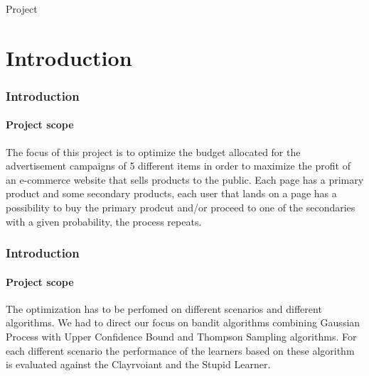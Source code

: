 \documentclass[11pt]{beamer}
\begin{document}
\frame{\titlepage}

\begin{frame}{Project}
    \tableofcontents[hideallsubsections]
\end{frame}


\AtBeginSection[]
{
\begin{frame}{}
    \tableofcontents[sections={\thesection}]
\end{frame}
}


\section{Introduction}


\begin{frame}

\frametitle{Introduction}
\framesubtitle{Project scope}

The focus of this project is to optimize the budget allocated for the advertisement campaigns of 5 different items in order to maximize the profit of an e-commerce website that sells products to the public.
Each page has a primary product and some secondary products, each user that lands on a page has a possibility to buy the primary prodcut and/or proceed to one of the secondaries with a given probability, the process repeats.

\end{frame}



\begin{frame}

\frametitle{Introduction}
\framesubtitle{Project scope}

The optimization has to be perfomed on different scenarios and different algorithms.
We had to direct our focus on bandit algorithms combining Gaussian Process with Upper Confidence Bound and Thompson Sampling algorithms.
For each different scenario the performance of the learners based on these algorithm is evaluated against the Clayrvoiant and the Stupid Learner.

\end{frame}

\end{document}
